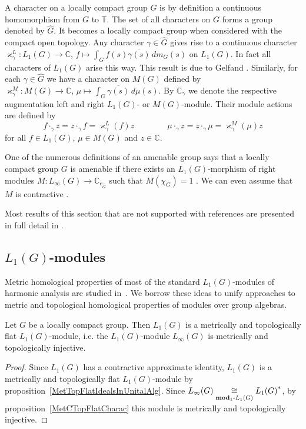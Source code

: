 A character on a locally compact group $G$ is by definition a continuous 
homomorphism from $G$ to $\mathbb{T}$. The set of all characters on $G$ forms a 
group denoted by $\widehat{G}$. It becomes a locally compact group when 
considered with the compact open topology. Any character $\gamma\in\widehat{G}$ 
gives rise to a continuous character 
$\varkappa_\gamma^L:
L_1(G)\to\mathbb{C},\, 
f\mapsto \int_G f(s)\overline{\gamma(s)}\,dm_G(s)$ on $L_1(G)$. In fact all 
characters of $L_1(G)$ arise this way. This result is due to 
Gelfand \cite[theorems 2.7.2, 2.7.5]{KaniBanAlg}. Similarly, for 
each $\gamma\in\widehat{G}$ we have a character on $M(G)$ defined by 
$\varkappa_\gamma^M:
M(G)\to\mathbb{C},\, 
\mu\mapsto\int_{G} \overline{\gamma(s)}\,d\mu(s)$. By $\mathbb{C}_\gamma$ we 
denote the respective augmentation left and right $L_1(G)$- or $M(G)$-module. 
Their module actions are defined by
\[
f\cdot_{\gamma}z=z\cdot_{\gamma}f=\varkappa_\gamma^L(f)z \qquad\qquad
\mu\cdot_{\gamma}z=z\cdot_{\gamma}\mu=\varkappa_\gamma^M(\mu)z
\]
for all $f\in L_1(G)$, $\mu\in M(G)$ and $z\in\mathbb{C}$. 

One of the numerous definitions of an amenable group says that a locally compact 
group $G$ is amenable if there exists an $L_1(G)$-morphism of right 
modules $M:L_\infty(G)\to\mathbb{C}_{e_{\widehat{G}}}$ such 
that $M(\chi_G)=1$ \cite[section VII.2.5]{HelBanLocConvAlg}. We can even 
assume that $M$ is contractive \cite[remark 7.1.54]{HelBanLocConvAlg}.

Most results of this section that are not supported with references are 
presented in full detail in \cite[section 3.3]{DalBanAlgAutCont}.


\subsection{
    \texorpdfstring{$L_1(G)$}{L1(G)}-modules}\label{
SubSectionL1GModules}

Metric homological properties of most of the standard $L_1(G)$-modules of 
harmonic analysis are studied in~\cite{GravInjProjBanMod}. We borrow these 
ideas to unify approaches to metric and topological homological properties 
of modules over group algebras.

\begin{proposition}\label{LInfIsL1MetrInj} Let $G$ be a locally compact group. 
Then $L_1(G)$ is a metrically and topologically flat $L_1(G)$-module, 
i.e. the $L_1(G)$-module $L_\infty(G)$ is metrically and topologically injective.
\end{proposition} 
\begin{proof} Since $L_1(G)$ has a contractive approximate identity, 
$L_1(G)$ is a metrically and topologically flat $L_1(G)$-module 
by proposition~\ref{MetTopFlatIdealsInUnitalAlg}. 
Since $L_\infty(G)\mathrel{\mathop{\cong}\limits_{\mathbf{mod}_1\text{-}L_1(G)}}{L_1(G)}^*$, by 
proposition~\ref{MetCTopFlatCharac} this module is metrically and topologically injective.
\end{proof}

